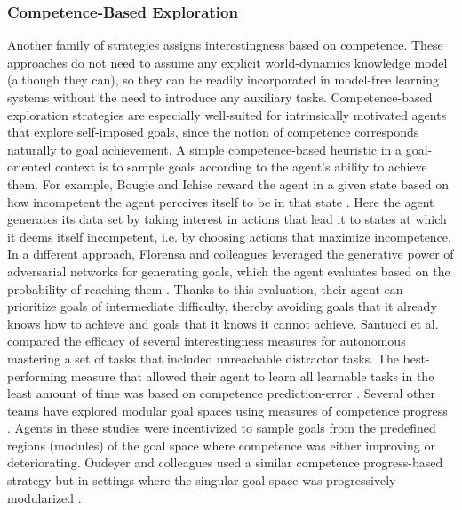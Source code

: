 \subsubsection{Competence-Based Exploration}\label{CH3_SSS_competence_based_exploration}
Another family of strategies assigns interestingness based on competence. These approaches do not need to assume any explicit world-dynamics knowledge model (although they can), so they can be readily incorporated in model-free learning systems without the need to introduce any auxiliary tasks. Competence-based exploration strategies are especially well-suited for intrinsically motivated agents that explore self-imposed goals, since the notion of competence corresponds naturally to goal achievement. A simple competence-based heuristic in a goal-oriented context is to sample goals according to the agent’s ability to achieve them. For example, Bougie and Ichise reward the agent in a given state based on how incompetent the agent perceives itself to be in that state \parencite{bougie_skill-based_2019}. Here the agent generates its data set by taking interest in actions that lead it to states at which it deems itself incompetent, i.e. by choosing actions that maximize incompetence. In a different approach, Florensa and colleagues leveraged the generative power of adversarial networks for generating goals, which the agent evaluates based on the probability of reaching them \parencite{florensa_automatic_2018}. Thanks to this evaluation, their agent can prioritize goals of intermediate difficulty, thereby avoiding goals that it already knows how to achieve and goals that it knows it cannot achieve. Santucci et al. compared the efficacy of several interestingness measures for autonomous mastering a set of tasks that included unreachable distractor tasks. The best-performing measure that allowed their agent to learn all learnable tasks in the least amount of time was based on competence prediction-error \parencite{santucci_which_2013}. Several other teams have explored modular goal spaces using measures of competence progress \parencite{stout_competence_2010,forestier_intrinsically_2020,colas_curious_2019}. Agents in these studies were incentivized to sample goals from the predefined regions (modules) of the goal space where competence was either improving or deteriorating. Oudeyer and colleagues used a similar competence progress-based strategy but in settings where the singular goal-space was progressively modularized \parencite{baranes_active_2013, moulin-frier_self-organization_2014}.

